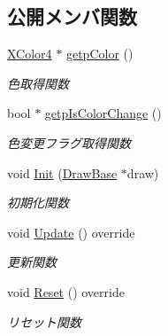 \subsection*{公開メンバ関数}
\begin{DoxyCompactItemize}
\item 
\mbox{\hyperlink{_vector3_d_8h_a680c30c4a07d86fe763c7e01169cd6cc}{X\+Color4}} $\ast$ \mbox{\hyperlink{class_push_space_logo_acdba863f2625454c1138dd0d79f90100}{getp\+Color}} ()
\begin{DoxyCompactList}\small\item\em 色取得関数 \end{DoxyCompactList}\item 
bool $\ast$ \mbox{\hyperlink{class_push_space_logo_ab61b852053e1ab953a34925f1aee3af1}{getp\+Is\+Color\+Change}} ()
\begin{DoxyCompactList}\small\item\em 色変更フラグ取得関数 \end{DoxyCompactList}\item 
void \mbox{\hyperlink{class_push_space_logo_a3d4177f8b8124e2f278998c912a8b4d4}{Init}} (\mbox{\hyperlink{class_draw_base}{Draw\+Base}} $\ast$draw)
\begin{DoxyCompactList}\small\item\em 初期化関数 \end{DoxyCompactList}\item 
void \mbox{\hyperlink{class_push_space_logo_a2f81cf35e02096bf309146c0bce0b44d}{Update}} () override
\begin{DoxyCompactList}\small\item\em 更新関数 \end{DoxyCompactList}\item 
void \mbox{\hyperlink{class_push_space_logo_afa163b1aff8df494b4f09f378bf983f0}{Reset}} () override
\begin{DoxyCompactList}\small\item\em リセット関数 \end{DoxyCompactList}\end{DoxyCompactItemize}
